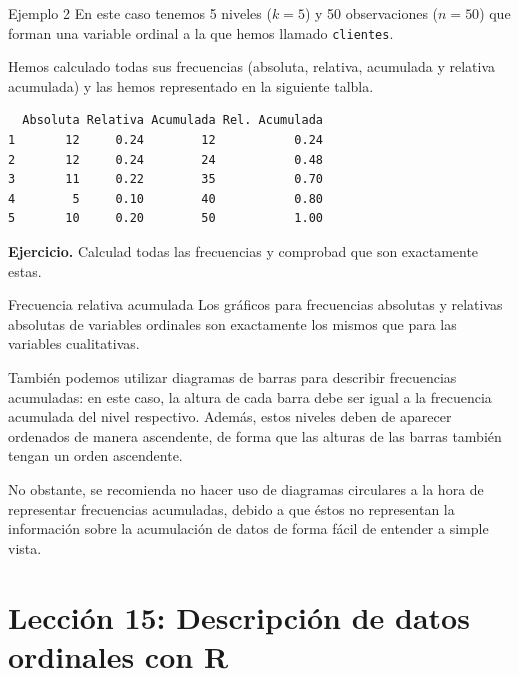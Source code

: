 \documentclass[
  ignorenonframetext,
  aspectratio=169]{beamer}
\begin{document}
\begin{frame}[fragile]{Ejemplo 2}
\label{ejemplo-2-1}
En este caso tenemos 5 niveles (\(k=5\)) y 50 observaciones (\(n=50\))
que forman una variable ordinal a la que hemos llamado
\texttt{clientes}.

Hemos calculado todas sus frecuencias (absoluta, relativa, acumulada y
relativa acumulada) y las hemos representado en la siguiente talbla.

\begin{verbatim}
  Absoluta Relativa Acumulada Rel. Acumulada
1       12     0.24        12           0.24
2       12     0.24        24           0.48
3       11     0.22        35           0.70
4        5     0.10        40           0.80
5       10     0.20        50           1.00
\end{verbatim}

\textbf{Ejercicio.} Calculad todas las frecuencias y comprobad que son
exactamente estas.
\end{frame}

\begin{frame}{Frecuencia relativa acumulada}
\label{frecuencia-relativa-acumulada-3}
Los gráficos para frecuencias absolutas y relativas absolutas de
variables ordinales son exactamente los mismos que para las variables
cualitativas.

También podemos utilizar diagramas de barras para describir frecuencias
acumuladas: en este caso, la altura de cada barra debe ser igual a la
frecuencia acumulada del nivel respectivo. Además, estos niveles deben
de aparecer ordenados de manera ascendente, de forma que las alturas de
las barras también tengan un orden ascendente.

No obstante, se recomienda no hacer uso de diagramas circulares a la
hora de representar frecuencias acumuladas, debido a que éstos no
representan la información sobre la acumulación de datos de forma fácil
de entender a simple vista.
\end{frame}

\section{Lección 15: Descripción de datos ordinales con
R}\label{lecciuxf3n-15-descripciuxf3n-de-datos-ordinales-con-r}
\end{document}
